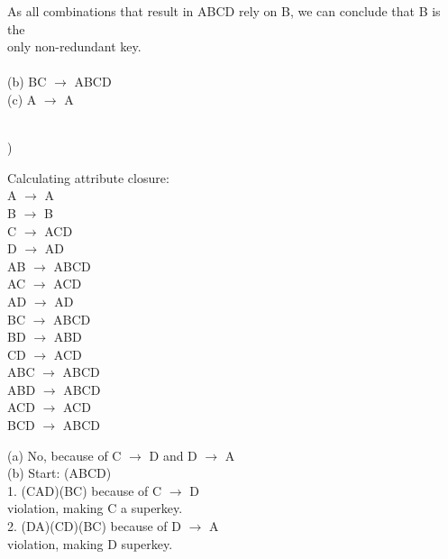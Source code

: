 \documentclass[12pt]{article}
\begin{document}
\indent \indent As all combinations that result in ABCD rely on B, we can conclude that B is the\\
\indent \indent only non-redundant key.\\\\

\indent \indent (b) BC $\rightarrow$ ABCD\\

\indent \indent (c) A $\rightarrow$ A\\


\hrulefill\\
\pagebreak


)
\begin{multicols}{2}
\indent Calculating attribute closure:\\
\indent A $\rightarrow$ A\\
\indent B $\rightarrow$ B\\
\indent C $\rightarrow$ ACD\\
\indent D $\rightarrow$ AD\\

AB $\rightarrow$ ABCD\\
\indent AC $\rightarrow$ ACD\\
\indent AD $\rightarrow$ AD\\

BC $\rightarrow$ ABCD\\
\indent BD $\rightarrow$ ABD\\
\indent CD $\rightarrow$ ACD\\

ABC $\rightarrow$ ABCD\\
\indent ABD $\rightarrow$ ABCD\\
\indent ACD $\rightarrow$ ACD\\
\indent BCD $\rightarrow$ ABCD\\

\columnbreak


\noindent(a) No, because of C $\rightarrow$ D and D $\rightarrow$ A\\

\noindent(b) Start: (ABCD)\\
1. (CAD)(BC) because of C $\rightarrow$ D\\ violation, making C a superkey.\\
2. (DA)(CD)(BC) because of D $\rightarrow$ A\\ violation, making D superkey.\\


\end{multicols}
\end{document}
